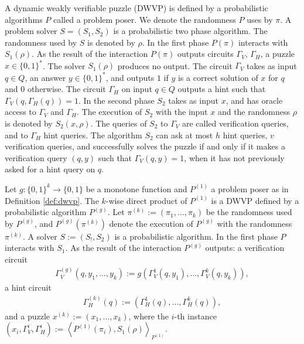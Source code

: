 \begin{definition}
  \label{def:dwvp}
  A dynamic weakly verifiable puzzle (DWVP) is defined by a probabilistic algorithms $P$
  called a problem poser. We denote the randomness $P$ uses by $\pi$.
  A problem solver $S = (S_1, S_2)$ is a probabilistic two phase algorithm. The randomness used by $S$ is denoted by $\rho$.
  In the first phase $P(\pi)$ interacts with $S_1(\rho)$. As the result of the interaction $P(\pi)$
  outputs circuits $\Gamma_{V}$, $\Gamma_{H}$, a puzzle $x \in \{0,1\}^{*}$. The solver $S_1(\rho)$ produces no output.
  The circuit $\Gamma_{V}$ takes as input $q \in Q$, an answer $y \in \{0,1\}^*$,
  and outputs $1$ if $y$ is a correct solution of $x$ for $q$ and $0$ otherwise.
  The circuit $\Gamma_H$ on input $q \in Q$ outputs a hint such that $\Gamma_V(q,\Gamma_H(q)) = 1$.
  In the second phase $S_2$ takes as input $x$, and has oracle access to $\Gamma_V$ and $\Gamma_H$.
  The execution of $S_2$ with the input $x$ and the randomness $\rho$
  is denoted by $S_2(x, \rho)$. The queries of $S_2$ to $\Gamma_V$ are called verification queries, and to $\Gamma_H$ hint queries.
  The algorithm $S_2$ can ask at most $h$ hint queries, $v$ verification queries, and successfully solves the puzzle if and only if
  it makes a verification query $(q,y)$ such that $\Gamma_V(q,y) = 1$, when it has not previously asked for a hint query on $q$.
\end{definition}
%
%
\begin{definition}
Let $g: \{0,1\}^{k} \rightarrow \{0,1\}$ be a monotone function and $P^{(1)}$ a problem poser as in Definition \ref{def:dwvp}.
The $k$-wise direct product of $P^{(1)}$ is a DWVP defined by a probabilistic algorithm $P^{(g)}$.
Let $\pi^{(k)} := (\pi_1, \dots, \pi_k)$ be the randomness used by $P^{(g)}$, and $P^{(g)}(\pi^{(k)})$ denote the execution of $P^{(g)}$ with the randomness $\pi^{(k)}$.
A solver $S := (S_!, S_2)$ is a probabilistic algorithm.
In the first phase $P$ interacts with $S_1$. As the result of the interaction $P^{(g)}$ outputs:
a verification circuit
\begin{align*}
  \Gamma_V^{(g)} (q, y_1, \dots, y_k) := g(\Gamma_V^{1}(q, y_1), \dots, \Gamma_V^{k}(q, y_k)),
\end{align*}
a hint circuit
\begin{align*}
  \Gamma_H^{(k)} (q) := (\Gamma_H^{1}(q), \dots, \Gamma_H^{k}(q)),
\end{align*}
and a puzzle $x^{(k)} := (x_1, \dots, x_k)$, where the $i$-th instance $(x_i, \Gamma_V^{i}, \Gamma_H^{i} ) := \left\langle P^{(1)}(\pi_i), S_1(\rho) \right\rangle_{P^{(1)}}$.
\end{definition}

